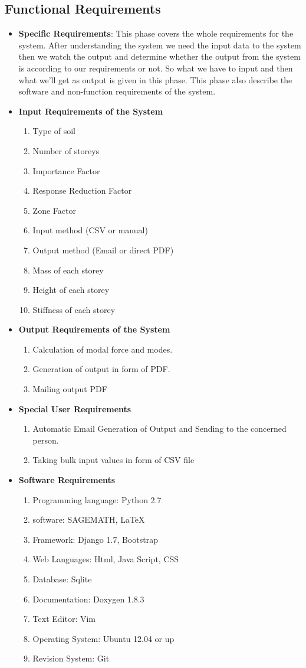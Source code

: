 \subsection{Functional Requirements}
\begin{itemize}
\item {\bf Specific Requirements}: This phase covers the whole requirements 
for the system. After understanding the system we need the input data 
to the system then we watch the output and determine whether the output 
from the system is according to our requirements or not. So what we have 
to input and then what we’ll get as output is given in this phase. This 
phase also describe the software and non-function requirements of the 
system.
\item {\bf Input Requirements of the System}
\begin{enumerate} 
\item Type of soil
\item Number of storeys
\item Importance Factor
\item Response Reduction Factor
\item Zone Factor
\item Input method (CSV or manual)
\item Output method (Email or direct PDF)
\item Mass of each storey
\item Height of each storey
\item Stiffness of each storey
\end{enumerate}
\vskip 0.5cm
\item {\bf Output Requirements of the System}
\begin{enumerate} 
\item Calculation of modal force and modes.
\item Generation of output in form of PDF.
\item Mailing output PDF 
\end{enumerate}
\vskip 0.5cm
\item {\bf Special User Requirements}
\begin{enumerate} 
\item Automatic Email Generation of Output and Sending to the concerned person.
\item Taking bulk input values in form of CSV file
\end{enumerate}
\vskip 0.5cm
\item {\bf Software Requirements}
\begin{enumerate} 
\item Programming language: Python 2.7
\item software: SAGEMATH, \LaTeX{}
\item Framework: Django 1.7, Bootstrap
\item Web Languages: Html, Java Script, CSS
\item Database: Sqlite 
\item Documentation: Doxygen 1.8.3
\item Text Editor: Vim
\item Operating System: Ubuntu 12.04 or up
\item Revision System: Git


\end{enumerate}
\end{itemize}
